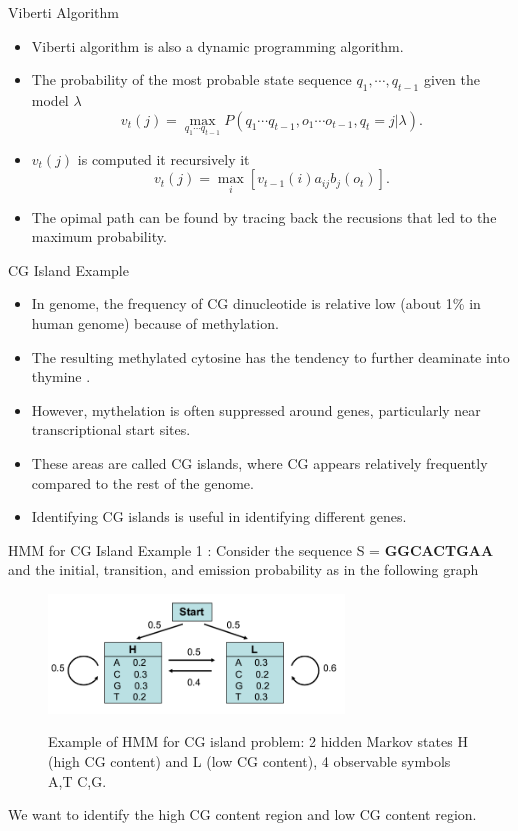 \documentclass{beamer}
\begin{document}
\begin{frame}{Viberti Algorithm}
	\begin{itemize}
		\item Viberti algorithm is also a dynamic programming algorithm.
		\item The probability of the most probable state sequence $q_1, \cdots, q_{t-1}$ given the model $\lambda$
		\begin{equation}
			v_t(j) = \max_{q_1\cdots q_{t-1}} P(q_1\cdots q_{t-1}, o_1\cdots o_{t-1}, q_t = j \vert \lambda).
		\end{equation}
		\item $v_t(j)$ is computed it recursively it 
		\begin{equation}
			v_t(j) = \max_i[v_{t-1}(i) a_{ij} b_j(o_t)].
		\end{equation}
		\item The opimal path can be found by tracing back the recusions that led to the maximum probability.
	\end{itemize}
\end{frame}


\begin{frame}{CG Island Example}
	\begin{itemize}
		\item In genome, the frequency of CG dinucleotide is relative low (about 1\% in human genome) because of methylation. 
		\item The resulting methylated cytosine has the tendency to further deaminate into thymine \cite{compeau2018bioinformatics}.
		\item However, mythelation is often suppressed around genes, particularly near transcriptional start sites.
		\item These areas are called CG islands, where CG appears relatively frequently compared to the rest of the genome.
		\item Identifying CG islands is useful in identifying different genes.
	\end{itemize}
\end{frame}


\begin{frame}{HMM for CG Island}
	Example 1 \cite{borodovsky2006problems}: Consider the sequence S = \textbf{GGCACTGAA} and the initial, transition, and emission probability as in the following graph
	\begin{figure}
		\centering
		\includegraphics[width = 0.7\textwidth]{example1.png}
		\label{fig:example1}
		\caption{Example of HMM for CG island problem: 2 hidden Markov states H (high CG content) and L (low CG content), 4 observable symbols A,T C,G.}
	\end{figure}
	We want to identify the high CG content region and low CG content region.
\end{frame} 
\end{document}
